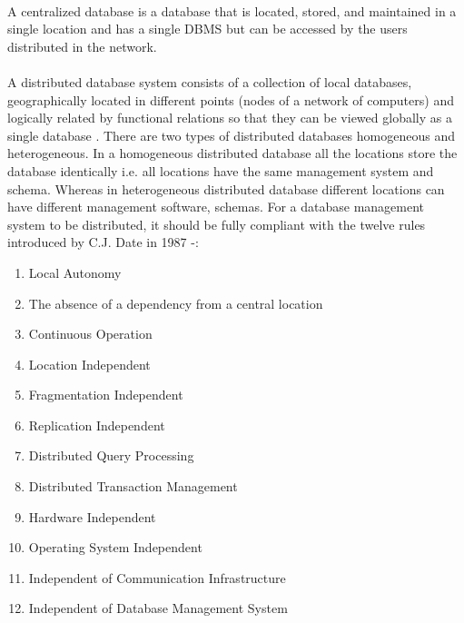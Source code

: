 \documentclass{article}
\begin{document}
        \paragraph{}
        A centralized database is a database that is located, stored, and maintained in a single location and has a single DBMS but can be accessed by the users distributed in the network.
        \paragraph{}
        A distributed database system consists of a collection of local databases,  geographically located in different points (nodes of a network of computers) and  logically related by functional relations so that they can be viewed globally as a single database \cite{distributeddatabase}.
        There are two types of distributed databases homogeneous and heterogeneous. In a homogeneous distributed database all the locations store the database identically i.e. all locations have the same management system and schema. Whereas in heterogeneous distributed database different locations can have different management software, schemas.
        For a database management system to be distributed, it should be fully compliant with the twelve rules introduced by C.J. Date in 1987 \cite{distributeddbms} -:
        \begin{enumerate}
            \item Local Autonomy
            \item The absence of a dependency from a central location
            \item Continuous Operation
            \item Location Independent
            \item Fragmentation Independent
            \item Replication  Independent
            \item Distributed Query Processing
            \item Distributed Transaction Management
            \item Hardware Independent
            \item Operating System Independent
            \item Independent of Communication  Infrastructure
            \item Independent of Database Management System
        \end{enumerate}
        
\end{document}
